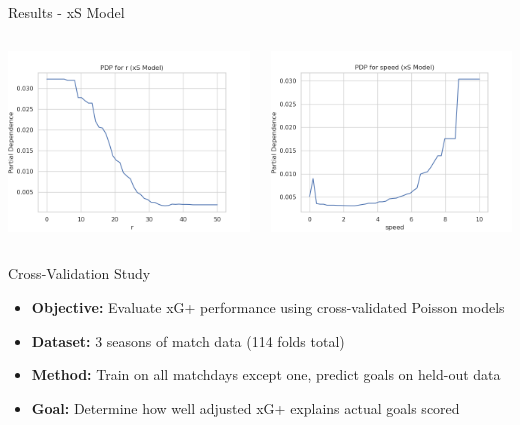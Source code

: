 \documentclass{beamer}
\begin{document}
\begin{frame}{Results - xS Model}
\begin{columns}[c]
  \includegraphics[width=\linewidth]{figures/xS_PDP_r.png}

  \includegraphics[width=\linewidth]{figures/xS_PDP_speed.png}
\end{columns}
\end{frame}

\begin{frame}{Cross-Validation Study}
\begin{itemize}
\item \textbf{Objective:} Evaluate xG+ performance using cross-validated Poisson models
\item \textbf{Dataset:} 3 seasons of match data (114 folds total)
\item \textbf{Method:} Train on all matchdays except one, predict goals on held-out data
\item \textbf{Goal:} Determine how well adjusted xG+ explains actual goals scored
\end{itemize}
\end{frame}
\end{document}
